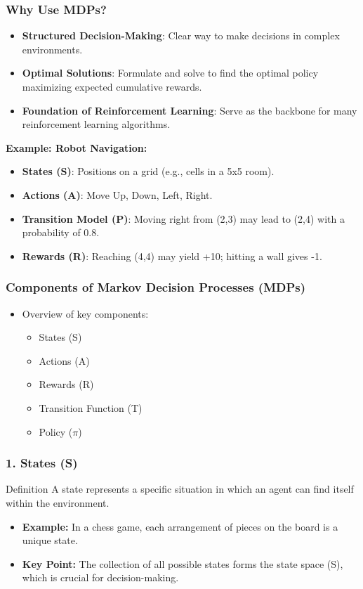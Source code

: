 \documentclass[aspectratio=169]{beamer}
\begin{document}
\begin{frame}[fragile]
    \frametitle{Why Use MDPs?}

    \begin{itemize}
        \item \textbf{Structured Decision-Making}: Clear way to make decisions in complex environments.
        \item \textbf{Optimal Solutions}: Formulate and solve to find the optimal policy maximizing expected cumulative rewards.
        \item \textbf{Foundation of Reinforcement Learning}: Serve as the backbone for many reinforcement learning algorithms.
    \end{itemize}

    \textbf{Example: Robot Navigation:}
    \begin{itemize}
        \item \textbf{States (S)}: Positions on a grid (e.g., cells in a 5x5 room).
        \item \textbf{Actions (A)}: Move Up, Down, Left, Right.
        \item \textbf{Transition Model (P)}: Moving right from (2,3) may lead to (2,4) with a probability of 0.8.
        \item \textbf{Rewards (R)}: Reaching (4,4) may yield +10; hitting a wall gives -1.
    \end{itemize}
\end{frame}

\begin{frame}[fragile]
    \frametitle{Components of Markov Decision Processes (MDPs)}
    \begin{itemize}
        \item Overview of key components:
        \begin{itemize}
            \item States (S)
            \item Actions (A)
            \item Rewards (R)
            \item Transition Function (T)
            \item Policy (\(\pi\))
        \end{itemize}
    \end{itemize}
\end{frame}

\begin{frame}[fragile]
    \frametitle{1. States (S)}
    \begin{block}{Definition}
        A state represents a specific situation in which an agent can find itself within the environment.
    \end{block}
    \begin{itemize}
        \item \textbf{Example:} In a chess game, each arrangement of pieces on the board is a unique state.
        \item \textbf{Key Point:} The collection of all possible states forms the state space (S), which is crucial for decision-making.
    \end{itemize}
\end{frame}
\end{document}
